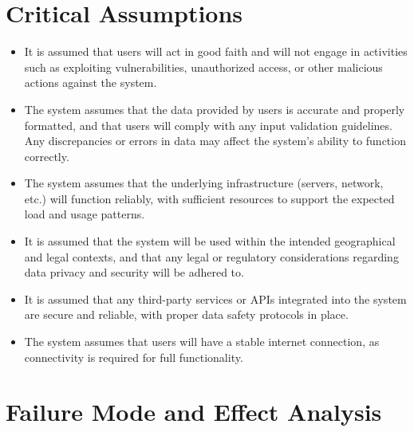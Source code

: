 \documentclass{article}
\begin{document}
\section{Critical Assumptions}

\begin{itemize}
  \item It is assumed that users will act in good faith and will not engage in activities such as
  exploiting vulnerabilities, unauthorized access, or other malicious actions against the system.
  
  \item The system assumes that the data provided by users is accurate and properly formatted, and
  that users will comply with any input validation guidelines. Any discrepancies or errors in data
  may affect the system's ability to function correctly.

  \item The system assumes that the underlying infrastructure (servers, network, etc.) will function
  reliably, with sufficient resources to support the expected load and usage patterns.
  
  \item It is assumed that the system will be used within the intended geographical and legal
  contexts, and that any legal or regulatory considerations regarding data privacy and security
  will be adhered to.
  
  \item It is assumed that any third-party services or APIs integrated into the system are secure
  and reliable, with proper data safety protocols in place.
  
  \item The system assumes that users will have a stable internet connection, as connectivity is
  required for full functionality.  
\end{itemize}

\section{Failure Mode and Effect Analysis}
\end{document}
